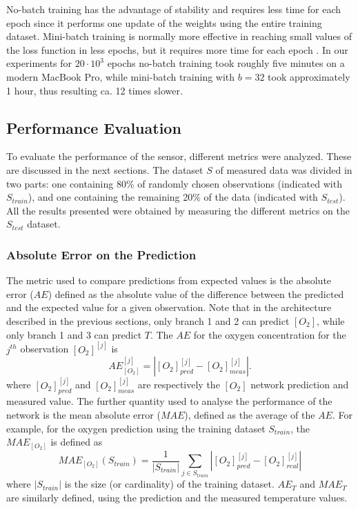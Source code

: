 \documentclass[sensors,article,submit,moreauthors,pdftex,10pt,a4paper]{Definitions/mdpi}
\begin{document}
No-batch training has the advantage of stability and requires less time for each epoch since it performs one update of the weights using the entire training dataset. Mini-batch training is normally more effective in reaching small values of the loss function in less epochs, but it requires more time for each epoch \cite{Michelucci2017}. In our experiments for $20 \cdot 10^3$ epochs no-batch training took roughly five minutes on a modern MacBook Pro, while mini-batch training with $b=32$ took approximately 1 hour, thus resulting ca. 12 times slower. 


\subsection{Performance Evaluation}

To evaluate the performance of the sensor, different metrics were analyzed. These are discussed in the next sections. The dataset $S$ of measured data was divided in two parts: one containing 80\% of randomly chosen observations (indicated with $S_{train}$), and one containing the remaining 20\% of the data (indicated with $S_{test}$). All the results presented were obtained by measuring the different metrics on the $S_{test}$ dataset.


\subsubsection{Absolute Error on the Prediction}

The metric used to compare predictions from expected values is the absolute error ($AE$) defined as the absolute value of the difference between the predicted and the expected value for a given observation. Note that in the architecture described in the previous sections, only branch 1 and 2 can predict $[O_2]$, 
while only branch 1 and 3 can predict $T$. The $AE$ for the oxygen concentration for the $j^{th}$ observation $[O_2]^{[j]}$  is 
\begin{equation}
\label{AE}
AE^{{[j]}}_{[O_2]} = |[O_2]^{{[j]}}_{pred}-[O_2]^{[j]}_{meas}|.
\end{equation}
where $[O_2]^{{[j]}}_{pred}$ and $[O_2]^{{[j]}}_{meas}$ are respectively the $[O_2]$ network prediction and measured value.
The further quantity used to analyse the performance of the network is the mean absolute error ($MAE$), defined as the average of the $AE$. For example, for the oxygen prediction using the training dataset $S_{train}$, the $MAE_{[O_2]}$ is defined as 
\begin{equation}
\label{MAE}
MAE_{[O_2]}(S_{train}) = \frac{1}{|S_{train}|} \sum_{j \in S_{train}}|[O_2]_{pred}^{[j]}-[O_2]_{real}^{[j]}|
\end{equation}
where $|S_{train}|$ is the size (or cardinality) of the training dataset. 
$AE_{T}$ and $MAE_T$ are similarly defined, using the prediction and the measured temperature values.
\end{document}
